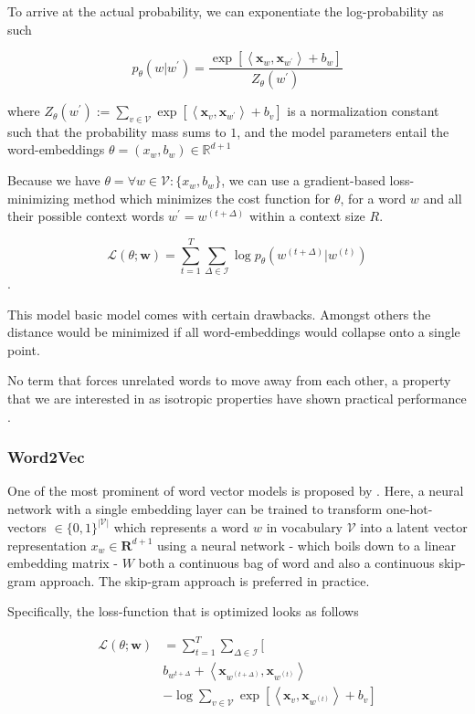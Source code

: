 \documentclass[a4paper,12pt,twoside,openright]{report}
\begin{document}
To arrive at the actual probability, we can exponentiate the log-probability as such

$$
p_{\theta}\left(w | w^{\prime}\right)=\frac{\exp \left[\left\langle\mathbf{x}_{w}, \mathbf{x}_{w^{\prime}}\right\rangle+b_{w}\right]}{Z_{\theta}\left(w^{\prime}\right)}
$$

where $Z_{\theta}\left(w^{\prime}\right):=\sum_{v \in \mathcal{V}} \exp \left[\left\langle\mathbf{x}_{v}, \mathbf{x}_{w^{\prime}}\right\rangle+b_{v}\right]$ is a normalization constant such that the probability mass sums to $1$, and the model parameters entail the word-embeddings $\theta = (x_w, b_w) \in \mathbb{R}^{d+1}$

Because we have $\theta = \forall w \in \mathcal{V} : \{ x_w, b_w \}$, we can use a gradient-based loss-minimizing method which minimizes the cost function for $\theta$, for a word $w$ and all their possible context words $w^{\prime} = w^{(t+\Delta)}$ within a context size $R$.

$$
\mathcal{L}(\theta ; \mathbf{w})=\sum_{t=1}^{T} \sum_{\Delta \in \mathcal{I}} \log p_{\theta}\left(w^{(t+\Delta)} | w^{(t)}\right)
$$.

This model basic model comes with certain drawbacks. 
Amongst others the distance would be minimized if all word-embeddings would collapse onto a single point. 

No term that forces unrelated words to move away from each other, a property that we are interested in as isotropic properties have shown practical performance \cite{ethayarajh19}.


\subsubsection{Word2Vec}

One of the most prominent of word vector models is proposed by \cite{mikolov13, mikolov13b}.
Here, a neural network with a single embedding layer can be trained to transform one-hot-vectors $\in \{ 0, 1 \}^{| \mathcal{V} |}$ which represents a word $w$ in vocabulary $\mathcal{V}$
into a latent vector representation $x_w \in \mathbf{R}^{d + 1}$ using a neural network - which boils down to a linear embedding matrix - $W$ both a continuous bag of word and also a continuous skip-gram approach.
The skip-gram approach is preferred in practice.

Specifically, the loss-function that is optimized looks as follows

\begin{align} 
\mathcal{L}(\theta ; \mathbf{w}) & =\sum_{t=1}^{T} \sum_{\Delta \in \mathcal{I}} [\\ 
& b_{w^{t+\Delta}} +\left\langle \mathbf{x}_{w^{(t+\Delta)}}, \mathbf{x}_{w^{(t)}} \right\rangle \\
& -\log \sum_{v \in \mathcal{V}} \exp \left[\left\langle\mathbf{x}_{v}, \mathbf{x}_{w^{(t)}}\right\rangle+b_{v} \right] 
\end{align}
\end{document}
